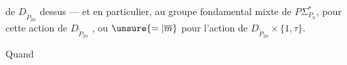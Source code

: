 de $D_{\widetilde P_{2n}}$ dessus — et en particulier, au groupe fondamental mixte de $P\Sigma_{P_n}^*$, pour cette action de $D_{\widetilde P_{2n}}$ , ou $\unsure{=|\overline m}$ pour l'action de $D_{\widetilde P_{2n}}\times\{1,\tau\}$. 

Quand

